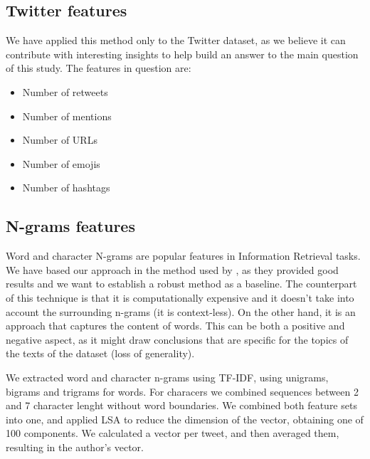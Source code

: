 \subsection{Twitter features}
We have applied this method only to the Twitter dataset, as we believe it can contribute with interesting insights to help build an answer to the main question of this study. The features in question are:
\begin{itemize}
    \item Number of retweets
    \item Number of mentions
    \item Number of URLs
    \item Number of emojis
    \item Number of hashtags
\end{itemize}

\subsection{N-grams features}
Word and character N-grams are popular features in Information Retrieval tasks. We have based our approach in the method used by \cite{garcia2022psychographic}, as they provided good results and we want to establish a robust method as a baseline. The counterpart of this technique is that it is computationally expensive and it doesn't take into account the surrounding n-grams (it is context-less). On the other hand, it is an approach that captures the content of words. This can be both a positive and negative aspect, as it might draw conclusions that are specific for the topics of the texts of the dataset (loss of generality).

We extracted word and character n-grams using \acrshort{TF-IDF}, using unigrams, bigrams and trigrams for words. For characers we combined sequences between 2 and 7 character lenght without word boundaries. We combined both feature sets into one, and applied \acrshort{LSA} to reduce the dimension of the vector, obtaining one of 100 components. We calculated a vector per tweet, and then averaged them, resulting in the author's vector.